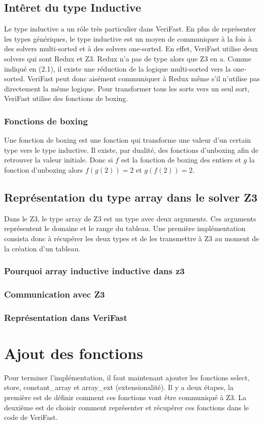 \documentclass[9pt]{book}
\newcommand{\verifast}{VeriFast}
\begin{document}
		\subsection{Int\^eret du type Inductive}
			Le type inductive a un r\^ole tr\`es particulier dans \verifast{}. En plus de repr\'esenter les types g\'en\'eriques, le type inductive est un moyen de communiquer \`a la fois \`a des solvers multi-sorted et \`a des solvers one-sorted. En effet, \verifast{} utilise deux solvers qui sont Redux et Z3. Redux n'a pas de type alors que Z3 en a. Comme indiqu\'e en (2.1), il existe une r\'eduction de la logique multi-sorted vers la one-sorted. \verifast{} peut donc ais\'ement communiquer \`a Redux m\^eme s'il n'utilise pas directement la m\^eme logique. Pour transformer tous les sorts vers un seul sort, \verifast{} utilise des fonctions de boxing.
			\subsubsection{Fonctions de boxing}
			Une fonction de boxing est une fonction qui transforme une valeur d'un certain type vers le type inductive. Il existe, par dualit\'e, des fonctions d'unboxing afin de retrouver la valeur initiale. Donc si $f$ est la fonction de boxing des entiers et $g$ la fonction d'unboxing alors $f(g(2)) = 2$ et $g(f(2)) = 2$.
		\subsection{Repr\'esentation du type array dans le solver Z3}
			Dans le Z3, le type array de Z3 est un type avec deux arguments. Ces arguments repr\'esentent le domaine et le range du tableau. Une premi\`ere impl\'ementation consista donc \`a r\'ecup\'erer les deux types et de les transmettre \`a Z3 au moment de la cr\'eation d'un tableau.
			\subsubsection{Pourquoi array inductive inductive dans z3}
			\subsubsection{Communication avec Z3}
			\subsubsection{Repr\'esentation dans \verifast{}}
	\section{Ajout des fonctions}
	Pour terminer l'impl\'ementation, il faut maintenant ajouter les fonctions select, store, constant\_array et array\_ext (extensionalit\'e). Il y a deux \'etapes, la premi\`ere est de d\'efinir comment ces fonctions vont \^etre communiqu\'e \`a Z3. La deuxi\`eme est de choisir comment repr\'esenter  et r\'ecup\'erer ces fonctions dans le code de \verifast{}.
\end{document}
